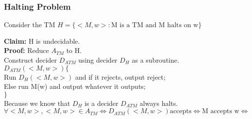 \subsubsection{Halting Problem}
Consider the TM $H = \{ <M, w> : \text{M is a TM and M halts on w} \}$
\begin{theorem}
  \textbf{Claim:} H is undecidable.
  \\ \textbf{Proof:} Reduce $A_{TM}$ to H.
  \\
  Construct decider $D_{ATM}$ using decider $D_H$ as a subroutine.
  \\
  $D_{ATM}(<M, w>) \{$
  \\ \indent Run $D_H(<M,w>)$ and if it rejects, output reject;
  \\ \indent Else run M(w) and output whatever it outputs;
  \\ $\}$
  \\
  Because we know that $D_H$ is a decider $D_{ATM}$ always halts.
  \\
  $\forall <M,w>, <M,w> \in A_{TM} \iff D_{ATM}(<M,w>) \text{accepts} \iff \text{M accepts w} \iff $
\end{theorem}
